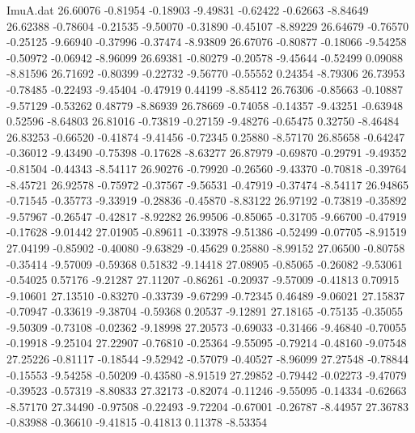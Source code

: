 \begin{filecontents}{ImuA.dat}
  26.60076   -0.81954   -0.18903   -9.49831   -0.62422   -0.62663   -8.84649
  26.62388   -0.78604   -0.21535   -9.50070   -0.31890   -0.45107   -8.89229
  26.64679   -0.76570   -0.25125   -9.66940   -0.37996   -0.37474   -8.93809
  26.67076   -0.80877   -0.18066   -9.54258   -0.50972   -0.06942   -8.96099
  26.69381   -0.80279   -0.20578   -9.45644   -0.52499    0.09088   -8.81596
  26.71692   -0.80399   -0.22732   -9.56770   -0.55552    0.24354   -8.79306
  26.73953   -0.78485   -0.22493   -9.45404   -0.47919    0.44199   -8.85412
  26.76306   -0.85663   -0.10887   -9.57129   -0.53262    0.48779   -8.86939
  26.78669   -0.74058   -0.14357   -9.43251   -0.63948    0.52596   -8.64803
  26.81016   -0.73819   -0.27159   -9.48276   -0.65475    0.32750   -8.46484
  26.83253   -0.66520   -0.41874   -9.41456   -0.72345    0.25880   -8.57170
  26.85658   -0.64247   -0.36012   -9.43490   -0.75398   -0.17628   -8.63277
  26.87979   -0.69870   -0.29791   -9.49352   -0.81504   -0.44343   -8.54117
  26.90276   -0.79920   -0.26560   -9.43370   -0.70818   -0.39764   -8.45721
  26.92578   -0.75972   -0.37567   -9.56531   -0.47919   -0.37474   -8.54117
  26.94865   -0.71545   -0.35773   -9.33919   -0.28836   -0.45870   -8.83122
  26.97192   -0.73819   -0.35892   -9.57967   -0.26547   -0.42817   -8.92282
  26.99506   -0.85065   -0.31705   -9.66700   -0.47919   -0.17628   -9.01442
  27.01905   -0.89611   -0.33978   -9.51386   -0.52499   -0.07705   -8.91519
  27.04199   -0.85902   -0.40080   -9.63829   -0.45629    0.25880   -8.99152
  27.06500   -0.80758   -0.35414   -9.57009   -0.59368    0.51832   -9.14418
  27.08905   -0.85065   -0.26082   -9.53061   -0.54025    0.57176   -9.21287
  27.11207   -0.86261   -0.20937   -9.57009   -0.41813    0.70915   -9.10601
  27.13510   -0.83270   -0.33739   -9.67299   -0.72345    0.46489   -9.06021
  27.15837   -0.70947   -0.33619   -9.38704   -0.59368    0.20537   -9.12891
  27.18165   -0.75135   -0.35055   -9.50309   -0.73108   -0.02362   -9.18998
  27.20573   -0.69033   -0.31466   -9.46840   -0.70055   -0.19918   -9.25104
  27.22907   -0.76810   -0.25364   -9.55095   -0.79214   -0.48160   -9.07548
  27.25226   -0.81117   -0.18544   -9.52942   -0.57079   -0.40527   -8.96099
  27.27548   -0.78844   -0.15553   -9.54258   -0.50209   -0.43580   -8.91519
  27.29852   -0.79442   -0.02273   -9.47079   -0.39523   -0.57319   -8.80833
  27.32173   -0.82074   -0.11246   -9.55095   -0.14334   -0.62663   -8.57170
  27.34490   -0.97508   -0.22493   -9.72204   -0.67001   -0.26787   -8.44957
  27.36783   -0.83988   -0.36610   -9.41815   -0.41813    0.11378   -8.53354

\end{filecontents}

